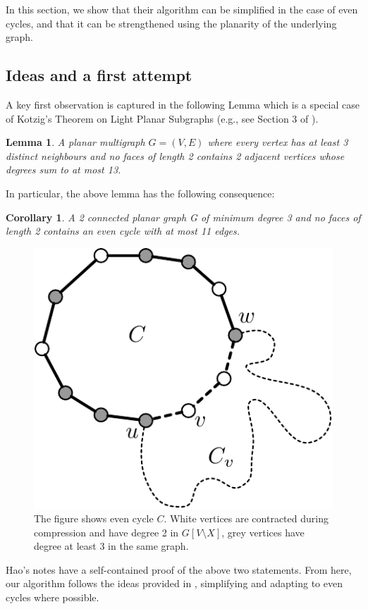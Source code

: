\documentclass{article}
\newcommand{\0}{\mathbb{0}}
\newcommand{\1}{\mathbb{1}}
\newtheorem{lemma}[theorem]{Lemma}
\newtheorem{cor}[theorem]{Corollary}
\begin{document}
In this
section, we show that their algorithm can be simplified in the case of
even cycles, and that it can be strengthened using the planarity of
the underlying graph.

\subsection{Ideas and a first attempt}

A key first observation is captured in the following Lemma which is a
special case of Kotzig's Theorem on Light Planar Subgraphs (e.g., see
Section 3 of \cite{JV13}). 

\begin{lemma}\label{discharge}
  A planar multigraph $ G=(V,E)$ where every vertex has at least 3
  distinct neighbours and no faces of length 2 contains 2 adjacent
  vertices whose degrees sum to at most 13.
\end{lemma}

In particular, the above lemma has the following consequence:

\begin{cor}\label{cor:smallec}
  A 2 connected planar graph G of minimum degree 3 and no faces of
  length 2 contains an even cycle with at most 11 edges.
\end{cor}

\begin{figure}
  \begin{center}
    \includegraphics[width=.3\textwidth]{simple-pd.pdf}
  \end{center}
  \caption{\label{fig:simplepd} The figure shows even cycle
    $C$. White vertices are contracted during compression and have
    degree 2 in $G[V\setminus X]$, grey vertices have degree at least
    3 in the same graph.}
\end{figure}

Hao's notes have a self-contained proof of the above two statements.
From here, our algorithm follows the ideas provided in \cite{FJP10},
simplifying and adapting to even cycles where possible. 
\end{document}
